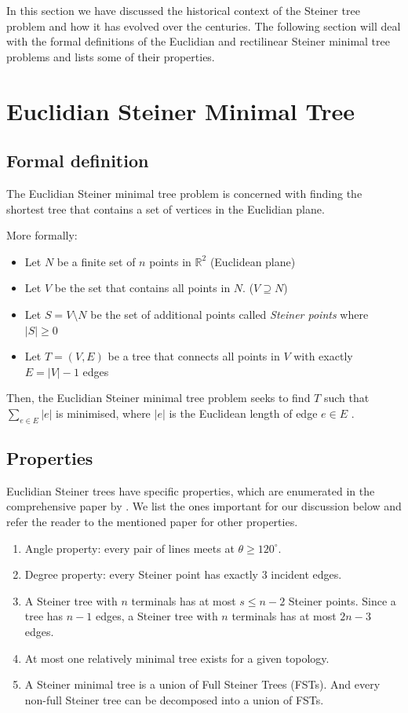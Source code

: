 \documentclass{l4proj}
\begin{document}
In this section we have discussed the historical context of the Steiner tree problem and how it has evolved over the centuries. The following section will deal with the formal definitions of the Euclidian and rectilinear Steiner minimal tree problems and lists some of their properties.

\section{Euclidian Steiner Minimal Tree}

\subsection{Formal definition}
The Euclidian Steiner minimal tree problem is concerned with finding the shortest tree that contains a set of vertices in the Euclidian plane.

More formally:
\begin{itemize}
    \item Let $N$ be a finite set of $n$ points in $\mathbb{R}^2$ (Euclidean plane)
    \item Let $V$ be the set that contains all points in $N$. ($V \supseteq N$)
    \item Let $S = V \setminus N$ be the set of additional points called \textit{Steiner points} where $|S| \geq 0$
    \item Let $T = (V, E)$ be a tree that connects all points in $V$ with exactly $E = |V| - 1$ edges
\end{itemize}

Then, the Euclidian Steiner minimal tree problem seeks to find $T$ such that $\sum_{e \in E} |e|$ is minimised, where $|e|$ is the Euclidean length of edge $e \in E$ \citep{Brazil2014}.

\subsection{Properties}
\label{sec:esmt_properties}
Euclidian Steiner trees have specific properties, which are enumerated in the comprehensive paper by \cite{Gilbert1968SteinerMT}. We list the ones important for our discussion below and refer the reader to the mentioned paper for other properties.

\begin{enumerate}
    \item Angle property: every pair of lines meets at $\theta \geq 120^\circ$.
    \item Degree property: every Steiner point has exactly 3 incident edges.
    \item \label{prop:esmt_fst} A Steiner tree with $n$ terminals has at most $s \leq n - 2$ Steiner points. Since a tree has $n - 1$ edges, a Steiner tree with $n$ terminals has at most $2n - 3$ edges.
    \item At most one relatively minimal tree exists for a given topology.
    \item \label{prop:smt_fst} A Steiner minimal tree is a union of Full Steiner Trees (FSTs). And every non-full Steiner tree can be decomposed into a union of FSTs.
\end{enumerate}
\end{document}
